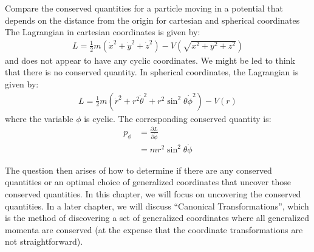 \begin{example}{0pt}{Compare the conserved quantities for a particle moving in a potential that depends on the distance from the origin for cartesian and spherical coordinates}{}
The Lagrangian in cartesian coordinates is given by:
\begin{align*}
L=\frac{1}{2}m(\dot{x}^2+\dot{y}^2+\dot{z}^2)-V\left(\sqrt{x^2+y^2+z^2}\right)
\end{align*}
and does not appear to have any cyclic coordinates. We might be led to think that there is no conserved quantity.
In spherical coordinates, the Lagrangian is given by:
\begin{align*}
L=\frac{1}{2}m(\dot{r}^2+r^2\dot{\theta}^2+r^2\sin^2{\theta}\dot{\phi}^2)-V(r)
\end{align*}
where the variable $\phi$ is cyclic. The corresponding conserved quantity is:
\begin{align*}
p_\phi &=\frac{\partial L}{\partial \dot{\phi}}\\
&=mr^2\sin^2\theta\dot{\phi}
\end{align*}
\end{example}

The question then arises of how to determine if there are any conserved quantities or an optimal choice of generalized coordinates that uncover those conserved quantities. In this chapter, we will focus on uncovering the conserved quantities. In a later chapter, we will discuss ``Canonical Transformations'', which is the method of discovering a set of generalized coordinates where all generalized momenta are conserved (at the expense that the coordinate transformations are not straightforward).


